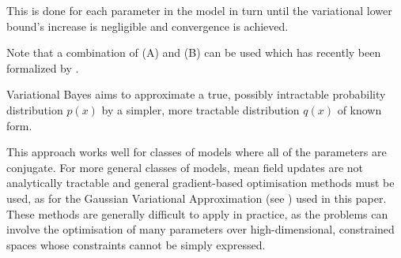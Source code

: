\noindent This is done for each parameter in the model in turn until the variational lower bound's increase is
negligible and convergence is achieved.

Note that a combination of (A) and (B) can be used which has recently been formalized by \cite{Rohde2015}.

\noindent Variational Bayes aims to approximate a true, possibly intractable probability distribution $p(x)$
by a simpler, more tractable distribution $q(x)$ of known form.

This approach works well for classes of models where all of the parameters are conjugate. For more
general classes of models, mean field updates are not analytically tractable and general gradient-based
optimisation methods must be used, as for the Gaussian Variational Approximation (see \citep{Ormerod2012}) used
in this paper. These methods are generally difficult to apply in practice, as the problems can involve the
optimisation of many parameters over high-dimensional, constrained spaces whose constraints cannot be simply
expressed.









